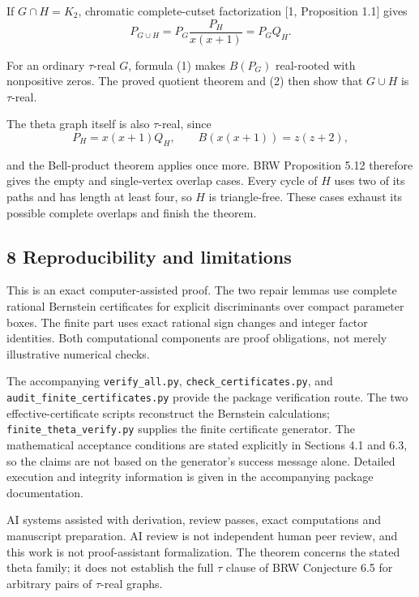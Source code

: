 \documentclass[
  11pt,
  a4paper,
]{article}
\begin{document}
If \(G\cap H=K_2\), chromatic complete-cutset factorization {[}1,
Proposition 1.1{]} gives
\nopagebreak
\[
P_{G\cup H}=P_G\frac{P_H}{x(x+1)}=P_GQ_H.
\]

For an ordinary \(\tau\)-real \(G\), formula (1) makes \(B(P_G)\)
real-rooted with nonpositive zeros. The proved quotient theorem and (2)
then show that \(G\cup H\) is \(\tau\)-real.

The theta graph itself is also \(\tau\)-real, since
\nopagebreak
\[
P_H=x(x+1)Q_H,\qquad B(x(x+1))=z(z+2),
\]

and the Bell-product theorem applies once more. BRW Proposition 5.12
therefore gives the empty and single-vertex overlap cases. Every cycle
of \(H\) uses two of its paths and has length at least four, so \(H\) is
triangle-free. These cases exhaust its possible complete overlaps and
finish the theorem.

\subsection{8 Reproducibility and
limitations}\label{reproducibility-and-limitations}

This is an exact computer-assisted proof. The two repair lemmas use
complete rational Bernstein certificates for explicit discriminants over
compact parameter boxes. The finite part uses exact rational sign
changes and integer factor identities. Both computational components are
proof obligations, not merely illustrative numerical checks.

The accompanying \texttt{\nolinkurl{verify_all.py}},
\texttt{\nolinkurl{check_certificates.py}}, and
\texttt{\nolinkurl{audit_finite_certificates.py}} provide the package
verification route. The two effective-certificate scripts reconstruct
the Bernstein calculations; \texttt{\nolinkurl{finite_theta_verify.py}}
supplies the finite certificate generator. The mathematical acceptance
conditions are stated explicitly in Sections 4.1 and 6.3, so the claims
are not based on the generator's success message alone. Detailed
execution and integrity information is given in the accompanying package
documentation.

AI systems assisted with derivation, review passes, exact computations
and manuscript preparation. AI review is not independent human peer
review, and this work is not proof-assistant formalization. The theorem
concerns the stated theta family; it does not establish the full
\(\tau\) clause of BRW Conjecture 6.5 for arbitrary pairs of
\(\tau\)-real graphs.
\end{document}
